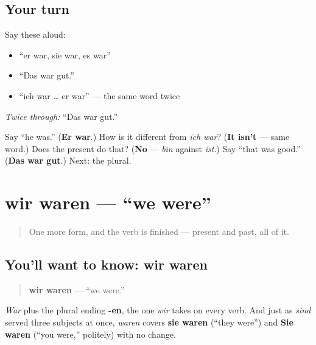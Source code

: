 \subsection*{Your turn}
Say these aloud:

\begin{itemize}
\raggedright
  \item \textquotedblleft{}er war, sie war, es war\textquotedblright{}
  \item \textquotedblleft{}Das war gut.\textquotedblright{}
  \item \textquotedblleft{}ich war … er war\textquotedblright{} — the same word twice
\end{itemize}

\emph{Twice through:} \textquotedblleft{}Das war gut.\textquotedblright{}

\begin{tcolorbox}[breakable,colback=teal!4,colframe=teal!35!black,title={Before you move on}]
Say \textquotedblleft{}he was.\textquotedblright{} (\textbf{Er war}.) How is it different from \emph{ich war}? (\textbf{It isn't} — same word.) Does the present do that? (\textbf{No} — \emph{bin} against \emph{ist}.) Say \textquotedblleft{}that was good.\textquotedblright{} (\textbf{Das war gut}.) Next: the plural.
\end{tcolorbox}
\section[wir waren]{wir waren — \textquotedblleft{}we were\textquotedblright{}}

\label{lesson:GE-C16-wir-waren}



\begin{quote}
One more form, and the verb is finished — present and past, all of it.
\end{quote}

\subsection*{You'll want to know: wir waren}
\begin{quote}
\textbf{wir waren} — \textquotedblleft{}we were.\textquotedblright{}
\end{quote}

\emph{War} plus the plural ending \textbf{-en}, the one \emph{wir} takes on every verb. And just as \emph{sind} served three subjects at once, \emph{waren} covers \textbf{sie waren} (\textquotedblleft{}they were\textquotedblright{}) and \textbf{Sie waren} (\textquotedblleft{}you were,\textquotedblright{} politely) with no change.

